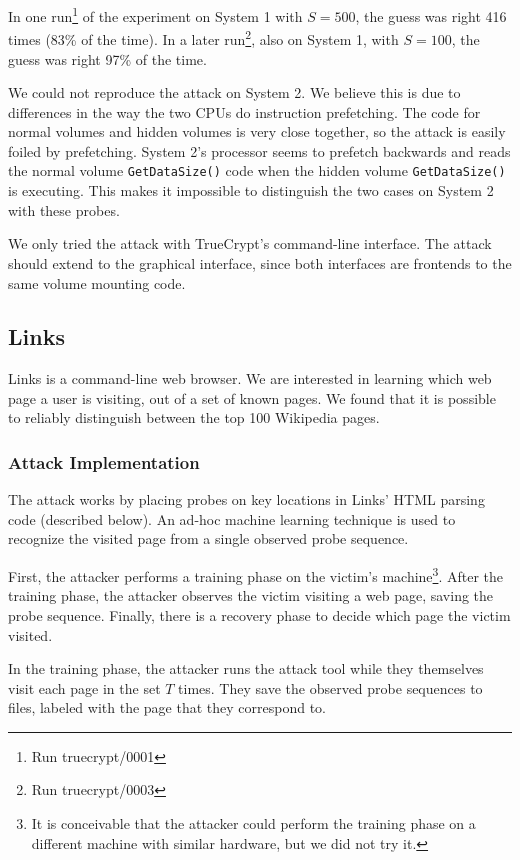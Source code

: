 \documentclass[letterpaper,twocolumn,10pt]{article}
\begin{document}
In one run\footnote{Run truecrypt/0001} of the experiment on System 1 with
$S=500$, the guess was right 416 times (83\% of the time). In a later
run\footnote{Run truecrypt/0003}, also on System 1, with $S=100$, the guess was
right 97\% of the time.

We could not reproduce the attack on System 2. We believe this is due to
differences in the way the two CPUs do instruction prefetching. The code for
normal volumes and hidden volumes is very close together, so the attack is
easily foiled by prefetching. System 2's processor seems to prefetch backwards
and reads the normal volume \texttt{GetDataSize()} code when the hidden volume
\texttt{GetDataSize()} is executing. This makes it impossible to distinguish the
two cases on System 2 with these probes.

We only tried the attack with TrueCrypt's command-line interface. The attack
should extend to the graphical interface, since both interfaces are frontends to
the same volume mounting code. 

\subsection{Links}

Links is a command-line web browser. We are interested in learning which web
page a user is visiting, out of a set of known pages. We found that it is
possible to reliably distinguish between the top 100 Wikipedia pages.

\subsubsection{Attack Implementation}

The attack works by placing probes on key locations in Links' HTML parsing code
(described below). An ad-hoc machine learning technique is used to recognize the
visited page from a single observed probe sequence.

First, the attacker performs a training phase on the victim's
machine\footnote{It is conceivable that the attacker could perform the training
phase on a different machine with similar hardware, but we did not try it.}.
After the training phase, the attacker observes the victim visiting a web page,
saving the probe sequence. Finally, there is a recovery phase to decide which
page the victim visited.

In the training phase, the attacker runs the attack tool while they themselves
visit each page in the set $T$ times. They save the observed probe sequences to
files, labeled with the page that they correspond to.
\end{document}
